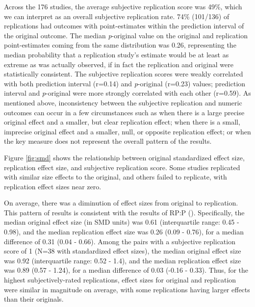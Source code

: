 \documentclass[
  english,
  a4paper,
]{article}
\begin{document}
Across the 176 studies, the average subjective replication score was 49\%, which we can interpret as an overall subjective replication rate. 74\% (101/136) of replications had outcomes with point-estimates within the prediction interval of the original outcome. The median \emph{p}-original value on the original and replication point-estimates coming from the same distribution was 0.26, representing the median probability that a replication study's estimate would be at least as extreme as was actually observed, if in fact the replication and original were statistically consistent. The subjective replication scores were weakly correlated with both prediction interval (r=0.14) and \emph{p}-original (r=0.23) values; prediction interval and \emph{p}-original were more strongly correlated with each other (r=0.59). As mentioned above, inconsistency between the subjective replication and numeric outcomes can occur in a few circumstances such as when there is a large precise original effect and a smaller, but clear replication effect; when there is a small, imprecise original effect and a smaller, null, or opposite replication effect; or when the key measure does not represent the overall pattern of the results.

Figure \ref{fig:smd} shows the relationship between original standardized effect size, replication effect size, and subjective replication score. Some studies replicated with similar size effects to the original, and others failed to replicate, with replication effect sizes near zero.

On average, there was a diminution of effect sizes from original to replication. This pattern of results is consistent with the results of RP:P (). Specifically, the median original effect size (in SMD units) was 0.61 (interquartile range: 0.45 - 0.98), and the median replication effect size was 0.26 (0.09 - 0.76), for a median difference of 0.31 (0.04 - 0.66). Among the pairs with a subjective replication score of 1 (N=38 with standardized effect sizes), the median original effect size was 0.92 (interquartile range: 0.52 - 1.4), and the median replication effect size was 0.89 (0.57 - 1.24), for a median difference of 0.03 (-0.16 - 0.33). Thus, for the highest subjectively-rated replications, effect sizes for original and replication were similar in magnitude on average, with some replications having larger effects than their originals.
\end{document}
